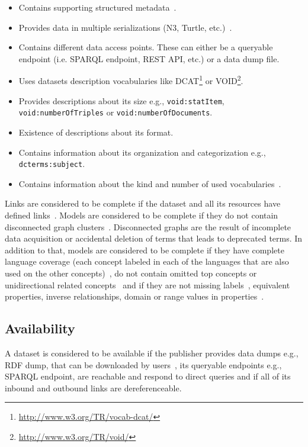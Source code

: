 \begin{itemize}
\item Contains supporting structured metadata~\cite{Hogan:LDOW:10}.
\item Provides data in multiple serializations (N3, Turtle, etc.)~\cite{Zaveri:SemWebJorunal:12}.
\item Contains different data access points. These can either be a queryable endpoint (i.e. SPARQL endpoint, REST API, etc.) or a data dump file.
\item Uses datasets description vocabularies like DCAT\footnote{\url{http://www.w3.org/TR/vocab-dcat/}} or VOID\footnote{\url{http://www.w3.org/TR/void/}}.
\item Provides descriptions about its size e.g., \texttt{void:statItem}, \texttt{void:numberOfTriples} or \texttt{void:numberOf\-Documents}.
\item Existence of descriptions about its format.
\item Contains information about its organization and categorization e.g., \texttt{dcterms:subject}.
\item Contains information about the kind and number of used vocabularies~\cite{Zaveri:SemWebJorunal:12}.
\end{itemize}

Links are considered to be complete if the dataset and all its resources have defined links~\cite{Hogan:LDOW:10,Mader:TBDL:12,Gueret:ESWC:12}. Models are considered to be complete if they do not contain disconnected graph clusters~\cite{Mader:TBDL:12}. Disconnected graphs are the result of incomplete data acquisition or accidental deletion of terms that leads to deprecated terms. In addition to that, models are considered to be complete if they have complete language coverage (each concept labeled in each of the languages that are also used on the other concepts)~\cite{Mader:TBDL:12}, do not contain omitted top concepts or unidirectional related concepts~\cite{Hogan:LDOW:10} and if they are not missing labels~\cite{Mader:TBDL:12}, equivalent properties, inverse relationships, domain or range values in properties~\cite{Maria:KEOD:13}.

\subsection{Availability}
A dataset is considered to be available if the publisher provides data dumps e.g., RDF dump, that can be downloaded by users~\cite{Flemming:Thesis:10,Hogan:LDOW:10}, its queryable endpoints e.g., SPARQL endpoint, are reachable and respond to direct queries and if all of its inbound and outbound links are dereferenceable.

